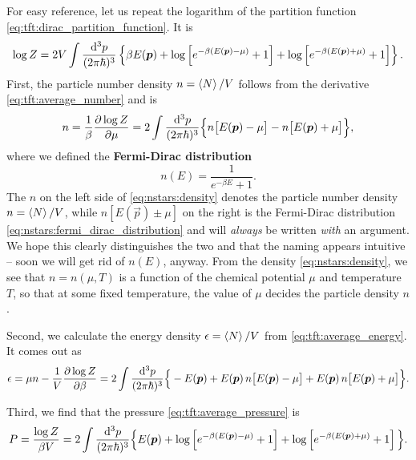 For easy reference, let us repeat the logarithm of the partition function \eqref{eq:tft:dirac_partition_function}.
It is
\begin{equation}
	\log Z = 2 V \int \frac{\mathop{}\!\mathrm{d}^3 p}{(2 \pi \hbar)^3} \left\{ \beta E({\bm{p}}) + \log \left[ e^{-\beta (E({\bm{p}}) - \mu)}+1 \right] + \log \left[ e^{-\beta (E({\bm{p}}) + \mu)} + 1\right] \right\}.
\end{equation}
First, the particle number density $n = \left< N \right>/V$ follows from the derivative \eqref{eq:tft:average_number} and is
\begin{equation}
	n = 
	\frac{1}{\beta} \pdv{\log Z}{\mu} =
	2 \int \frac{\mathop{}\!\mathrm{d}^3 p}{(2 \pi \hbar)^3} \Big\{ n\big[ E({\bm{p}})-\mu \big] - n\big[ E({\bm{p}})+\mu \big] \Big\} ,
\label{eq:nstars:density}
\end{equation}
where we defined the \textbf{Fermi-Dirac distribution}
\begin{equation}
	n(E) = \frac{1}{e^{-\beta E} + 1}.
\label{eq:nstars:fermi_dirac_distribution}
\end{equation}
The $n$ on the left side of \cref{eq:nstars:density} denotes the particle number density $n = \left< N \right>/V$, while $n \left[ E(\vec{p}) \pm \mu \right]$ on the right is the Fermi-Dirac distribution \eqref{eq:nstars:fermi_dirac_distribution} and will \emph{always} be written \emph{with} an argument.
We hope this clearly distinguishes the two and that the naming appears intuitive -- soon we will get rid of $n(E)$, anyway.
From the density \eqref{eq:nstars:density}, we see that $n = n(\mu, T)$ is a function of the chemical potential $\mu$ and temperature $T$, so that at some fixed temperature, the value of $\mu$ decides the particle density $n$.

Second, we calculate the energy density $\epsilon = \left< N \right> / V$ from \cref{eq:tft:average_energy}.
It comes out as
\begin{equation}
	\epsilon = 
	\mu n - \frac{1}{V} \pdv{\log Z}{\beta} =
	2 \int \frac{\mathop{}\!\mathrm{d}^3 p}{(2 \pi \hbar)^3} \Big\{ -E({\bm{p}}) + E({\bm{p}}) \, n\big[ E({\bm{p}})-\mu \big] + E({\bm{p}}) \, n\big[ E({\bm{p}})+\mu \big] \Big\}.
\label{eq:nstars:energy_density}
\end{equation}

Third, we find that the pressure \eqref{eq:tft:average_pressure} is
\begin{equation}
	P =
	\frac{\log Z}{\beta V} = 
	2 \int \frac{\mathop{}\!\mathrm{d}^3 p}{(2 \pi \hbar)^3} \Big\{ E({\bm{p}}) + \log \left[ e^{-\beta(E({\bm{p}})-\mu)} + 1 \right] + \log \left[ e^{-\beta(E({\bm{p}})+\mu)} + 1 \right] \Big\}.
\label{eq:nstars:pressure}
\end{equation}

